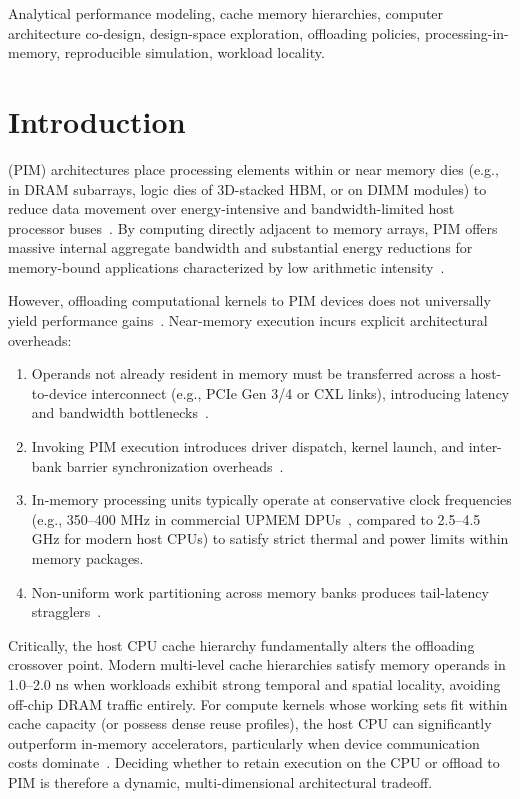 \documentclass[journal,10pt,twocolumn]{IEEEtran}
\begin{document}
\begin{IEEEkeywords}
Analytical performance modeling, cache memory hierarchies, computer architecture co-design, design-space exploration, offloading policies, processing-in-memory, reproducible simulation, workload locality.
\end{IEEEkeywords}

\section{Introduction}
 (PIM) architectures place processing elements within or near memory dies (e.g., in DRAM subarrays, logic dies of 3D-stacked HBM, or on DIMM modules) to reduce data movement over energy-intensive and bandwidth-limited host processor buses~\cite{Asifuzzaman2023,Mutlu2023}. By computing directly adjacent to memory arrays, PIM offers massive internal aggregate bandwidth and substantial energy reductions for memory-bound applications characterized by low arithmetic intensity~\cite{Hajinazar2021,GomezLuna2022,Kwon2021}.

However, offloading computational kernels to PIM devices does not universally yield performance gains~\cite{Devic2022}. Near-memory execution incurs explicit architectural overheads:
\begin{enumerate}
    \item Operands not already resident in memory must be transferred across a host-to-device interconnect (e.g., PCIe Gen 3/4 or CXL links), introducing latency and bandwidth bottlenecks~\cite{GomezLuna2022}.
    \item Invoking PIM execution introduces driver dispatch, kernel launch, and inter-bank barrier synchronization overheads~\cite{Giannoula2021}.
    \item In-memory processing units typically operate at conservative clock frequencies (e.g., 350--400 MHz in commercial UPMEM DPUs~\cite{GomezLuna2022}, compared to 2.5--4.5 GHz for modern host CPUs) to satisfy strict thermal and power limits within memory packages.
    \item Non-uniform work partitioning across memory banks produces tail-latency stragglers~\cite{GomezLuna2022,Giannoula2021}.
\end{enumerate}

Critically, the host CPU cache hierarchy fundamentally alters the offloading crossover point. Modern multi-level cache hierarchies satisfy memory operands in 1.0--2.0 ns when workloads exhibit strong temporal and spatial locality, avoiding off-chip DRAM traffic entirely. For compute kernels whose working sets fit within cache capacity (or possess dense reuse profiles), the host CPU can significantly outperform in-memory accelerators, particularly when device communication costs dominate~\cite{Kim2019,Devic2022}. Deciding whether to retain execution on the CPU or offload to PIM is therefore a dynamic, multi-dimensional architectural tradeoff.
\end{document}
